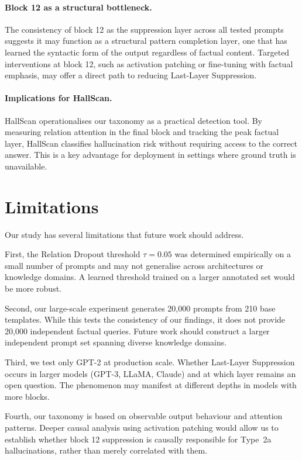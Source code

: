 \documentclass[11pt,a4paper]{article}
\begin{document}
\paragraph{Block 12 as a structural bottleneck.}
The consistency of block 12 as the suppression layer across
all tested prompts suggests it may function as a structural
pattern completion layer, one that has learned the syntactic
form of the output regardless of factual content.
Targeted interventions at block 12, such as activation
patching or fine-tuning with factual emphasis, may offer
a direct path to reducing Last-Layer Suppression.

\paragraph{Implications for HallScan.}
HallScan operationalises our taxonomy as a practical
detection tool. By measuring relation attention in the final
block and tracking the peak factual layer, HallScan
classifies hallucination risk without requiring access to
the correct answer. This is a key advantage for deployment
in settings where ground truth is unavailable.

\section{Limitations}

Our study has several limitations that future work should
address.

First, the Relation Dropout threshold $\tau = 0.05$ was
determined empirically on a small number of prompts and may
not generalise across architectures or knowledge domains.
A learned threshold trained on a larger annotated set would
be more robust.

Second, our large-scale experiment generates 20,000 prompts
from 210 base templates. While this tests the consistency
of our findings, it does not provide 20,000 independent
factual queries. Future work should construct a larger
independent prompt set spanning diverse knowledge domains.

Third, we test only GPT-2 at production scale. Whether
Last-Layer Suppression occurs in larger models (GPT-3,
LLaMA, Claude) and at which layer remains an open question.
The phenomenon may manifest at different depths in models
with more blocks.

Fourth, our taxonomy is based on observable output behaviour
and attention patterns. Deeper causal analysis using
activation patching \citep{elhage2021mathematical} would
allow us to establish whether block 12 suppression is
causally responsible for Type~2a hallucinations, rather
than merely correlated with them.
\end{document}
